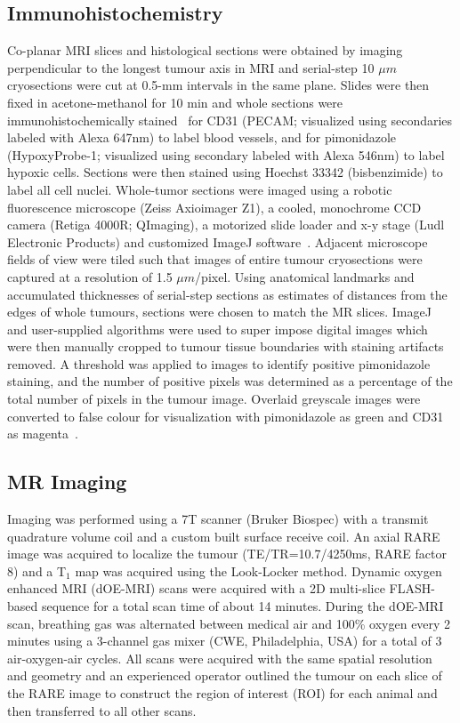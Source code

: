 \subsection{Immunohistochemistry}
Co-planar MRI slices and histological sections were obtained by imaging perpendicular to the longest tumour axis in MRI and serial-step 10 $\mu m$ cryosections were cut at 0.5-mm intervals in the same plane.
Slides were then fixed in acetone-methanol for 10 min and whole sections were immunohistochemically stained~\cite{Kalra:2017is} for CD31 (PECAM; visualized using secondaries labeled with Alexa 647nm) to label blood vessels, and for pimonidazole (HypoxyProbe-1; visualized using secondary labeled with Alexa 546nm) to label hypoxic cells. Sections were then stained using Hoechst 33342 (bisbenzimide) to label all cell nuclei.
Whole-tumor sections were imaged using a robotic fluorescence microscope (Zeiss Axioimager Z1), a cooled, monochrome CCD camera (Retiga 4000R; QImaging), a motorized slide loader and x-y stage (Ludl Electronic Products) and customized ImageJ software~\cite{Collins:2007jr}. 
Adjacent microscope fields of view were tiled such that images of entire tumour cryosections were captured at a resolution of 1.5 $\mu m$/pixel. 
Using anatomical landmarks and accumulated thicknesses of serial-step sections as estimates of distances from the edges of whole tumours, sections were chosen to match the MR slices. 
ImageJ and user-supplied algorithms were used to super impose digital images which were then manually cropped to tumour tissue boundaries with staining artifacts removed. 
A threshold was applied to images to identify positive pimonidazole staining, and the number of positive pixels was determined as a percentage of the total number of pixels in the tumour image. 
Overlaid greyscale images were converted to false colour for visualization with pimonidazole as green and CD31 as magenta~.

\subsection{MR Imaging}
Imaging was performed using a 7T scanner (Bruker Biospec) with a transmit quadrature volume coil and a custom built surface receive coil. 
An axial RARE image was acquired to localize the tumour (TE/TR=10.7/4250ms, RARE factor 8) and a T$_1$ map was acquired using the Look-Locker method.
Dynamic oxygen enhanced MRI (dOE-MRI) scans were acquired with a 2D multi-slice FLASH-based sequence for a total scan time of about 14 minutes.
During the dOE-MRI scan, breathing gas was alternated between medical air and 100\% oxygen every 2 minutes using a 3-channel gas mixer (CWE, Philadelphia, USA) for a total of 3 air-oxygen-air cycles.
All scans were acquired with the same spatial resolution and geometry and an experienced operator outlined the tumour on each slice of the RARE image to construct the region of interest (ROI) for each animal and then transferred to all other scans.

